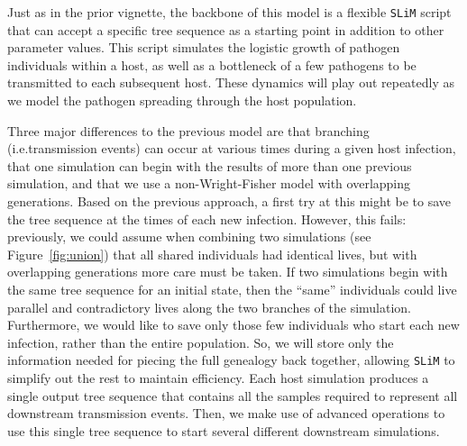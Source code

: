\documentclass[12pt]{article}
\newcommand{\slim}[0]{\texttt{SLiM}\xspace}
\newcommand*{\ie}{i.e.\xcomma}
\begin{document}
Just as in the prior vignette, the backbone of this model is a flexible \slim script that can accept a specific tree sequence as a starting point in addition to other
parameter values.
This script simulates the logistic growth of pathogen individuals within a host,
as well as a bottleneck of a few pathogens to be transmitted to each subsequent host.
These dynamics will play out repeatedly as we model the pathogen
spreading through the host population.

Three major differences to the previous model are that branching (\ie transmission events) can occur at various times during a given host infection,
that one simulation can begin with the results of more than one previous simulation,
and that we use a non-Wright-Fisher model with overlapping generations.
Based on the previous approach,
a first try at this might be to save the tree sequence at the times of each new infection.
However, this fails:
previously, we could assume when combining two simulations
(see Figure~\ref{fig:union}) that all shared individuals had identical lives,
but with overlapping generations more care must be taken.
If two simulations begin with the same tree sequence for an initial state,
then the ``same'' individuals could live parallel and contradictory lives along the two branches of the simulation.
Furthermore, we would like to save only those few individuals who start each new infection,
rather than the entire population.
So, we will store only the information needed for piecing the full genealogy back together, allowing \slim to simplify out the rest to maintain efficiency.
Each host simulation produces a single output tree sequence
that contains all the samples required to represent all downstream transmission events.
Then, we make use of advanced operations to use this single tree sequence
to start several different downstream simulations.
\end{document}
